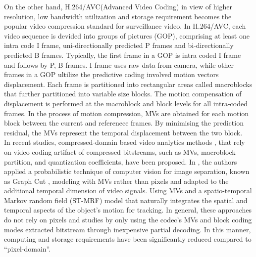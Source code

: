 On the other hand, H.264/AVC(Advanced Video Coding) in view of higher resolution, low bandwidth utilization and storage requirement becomes the popular video compression standard for surveillance video. In H.264/AVC, each video sequence is devided into groups of pictures (GOP), comprising at least one intra code I frame, uni-directionally predicted P frames and bi-directionally predicted B frames. Typically, the first frame in a GOP is intra coded I frame and follows by P, B frames. I frame uses raw data from camera, while other frames in a GOP ultilize the predictive coding involved motion vectors displacement. Each frame is partitioned into rectangular areas called macroblocks that further partitioned into variable size blocks. The motion compensation of displacement is performed at the macroblock and block levels for all intra-coded frames. In the process of motion compression, MVs are obtained for each motion block between the current and referenece frames. By minimising the prediction residual, the MVs represent the temporal displacement between the two block. \\
In recent studies, compressed-domain based video analytics methods  \cite{bombardelli2018efficient},\cite{khatoonabadi2012video} that rely on video coding artifact of compressed bitstreams, such as MVs, macroblock partition, and quantization coefficients, have been proposed. In \cite{bombardelli2018efficient}, the authors applied a probabilistic technique of computer vision for image separation, known as Graph Cut \cite{boykov2001fast}, modeling with MVs rather than pixels and adapted to the additional temporal dimension of video signals. Using MVs and a spatio-temporal Markov random field (ST-MRF) model that naturally integrates the spatial and temporal aspects of the object’s motion for tracking. In general, these approaches do not rely on pixels and studies by only using the codec’s MVs and block coding modes extracted bitstream through inexpensive partial decoding. In this manner, computing and storage requirements have been significantly reduced compared to “pixel-domain”.\\


